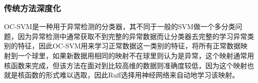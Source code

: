 





\subsubsection{传统方法深度化}

OC-SVM\cite{DBLP:journals/tdsc/WatsonSMMH16}是一种用于异常检测的分类器，其不同于一般的SVM做一个多分类问题，因为异常检测中通常获取不到完整的异常数据而让分类器去完整的学习异常类别的特征，因此OC-SVM用来学习正常数据这一类别的特征，将所有正常数据映射到一个球里，如果新数据用相同的映射不在球里则认为是异常，这个映射通常用核函数来完成，但该方法在面对到比较高维的数据则准确度较低，因为这个映射也就是核函数的形式难以选取，因此Ruff\cite{ruff2018deep}选择用神经网络来自动地学习该映射。


